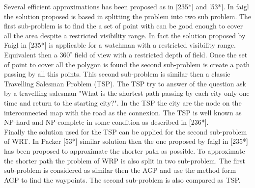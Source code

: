 Several efficient approximations has been proposed as in [235*] and [53*]. In faigl the solution proposed is based in splitting the problem into two sub problem. The first sub-problem is to find the a set of point with can  be good enough to cover all the area despite a restricted visibility range. In fact the solution proposed by Faigl in [235*] is applicable for a watchman with a restricted visibility range. Equivalent then a $360^\circ$ field of view with a restricted depth of field. Once the set of point to cover all the polygon is found the second sub-problem is create a path passing by all this points. This second sub-problem is similar then a classic Travelling Salesman Problem (TSP). The TSP  try to answer of the question ask by a travelling salesman "What is the shortest path passing by each city only one time and return to the starting city?". In the TSP the city are the node on the interconnected map with the road as the connexion. The TSP is well known as NP-hard and NP-complete in some condition as described in [236*]. \\ 
Finally the solution used for the TSP can be applied for the second sub-problem of WRT.
In Packer [53*] similar solution then the one proposed by faigl in [235*] has been proposed to approximate the shorter path as possible. To approximate the shorter path the problem of WRP is also split in two sub-problem. The first sub-problem is considered as similar then the AGP and use the method form AGP to find the waypoints. The second sub-problem is also compared as TSP.






